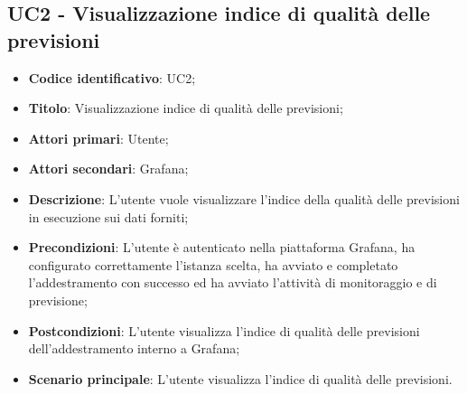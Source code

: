 \subsection{UC2 - Visualizzazione indice di qualità delle previsioni}
\begin{itemize}
	\item \textbf{Codice identificativo}: UC2;
	\item \textbf{Titolo}: Visualizzazione indice di qualità delle previsioni;
	\item \textbf{Attori primari}: Utente;
	\item \textbf{Attori secondari}: Grafana\glo;
	\item \textbf{Descrizione}: L'utente vuole visualizzare l'indice della qualità delle previsioni in esecuzione sui dati forniti;
	\item \textbf{Precondizioni}: L'utente è autenticato nella piattaforma Grafana\glosp, ha configurato correttamente l'istanza scelta, ha avviato e completato l'addestramento con successo ed ha avviato l'attività di monitoraggio e di previsione;
	\item \textbf{Postcondizioni}: L'utente visualizza l'indice di qualità delle previsioni dell'addestramento interno a Grafana\glo;
	\item \textbf{Scenario principale}: L'utente visualizza l'indice di qualità delle previsioni.
\end{itemize}